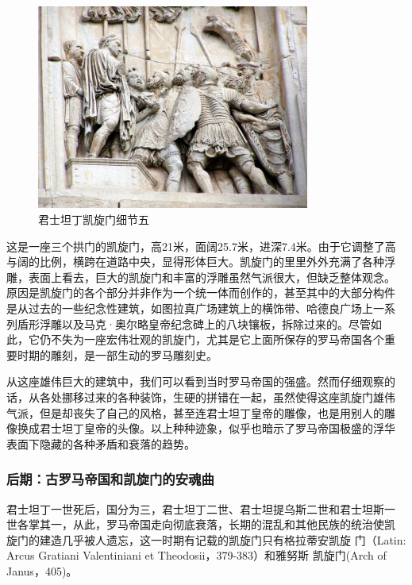 \documentclass[a4paper,dvipdfm]{article}
\begin{document}
\begin{figure}[hbt!]
  \centering
  \includegraphics[width=0.8\textwidth]{Arch_of_Constantine_Deatails04}
  \caption{君士坦丁凯旋门细节五}
  \label{fig:contiantine5}
\end{figure}

这是一座三个拱门的凯旋门，高21米，面阔25.7米，进深7.4米。由于它调整了高
与阔的比例，横跨在道路中央，显得形体巨大。凯旋门的里里外外充满了各种浮
雕，表面上看去，巨大的凯旋门和丰富的浮雕虽然气派很大，但缺乏整体观念。
原因是凯旋门的各个部分并非作为一个统一体而创作的，甚至其中的大部分构件
是从过去的一些纪念性建筑，如图拉真广场建筑上的横饰带、哈德良广场上一系
列盾形浮雕以及马克·奥尔略皇帝纪念碑上的八块镶板，拆除过来的。尽管如
此，它仍不失为一座宏伟壮观的凯旋门，尤其是它上面所保存的罗马帝国各个重
要时期的雕刻，是一部生动的罗马雕刻史。

从这座雄伟巨大的建筑中，我们可以看到当时罗马帝国的强盛。然而仔细观察的
话，从各处挪移过来的各种装饰，生硬的拼错在一起，虽然使得这座凯旋门雄伟
气派，但是却丧失了自己的风格，甚至连君士坦丁皇帝的雕像，也是用别人的雕
像换成君士坦丁皇帝的头像。以上种种迹象，似乎也暗示了罗马帝国极盛的浮华
表面下隐藏的各种矛盾和衰落的趋势。

\clearpage

\subsubsection{后期：古罗马帝国和凯旋门的安魂曲}

君士坦丁一世死后，国分为三，君士坦丁二世、君士坦提乌斯二世和君士坦斯一
世各掌其一，从此，罗马帝国走向彻底衰落，长期的混乱和其他民族的统治使凯
旋门的建造几乎被人遗忘，这一时期有记载的凯旋门只有格拉蒂安凯旋
门（Latin: Arcus Gratiani Valentiniani et Theodosii，379-383）和雅努斯
凯旋门(Arch of Janus，405)。
\end{document}
